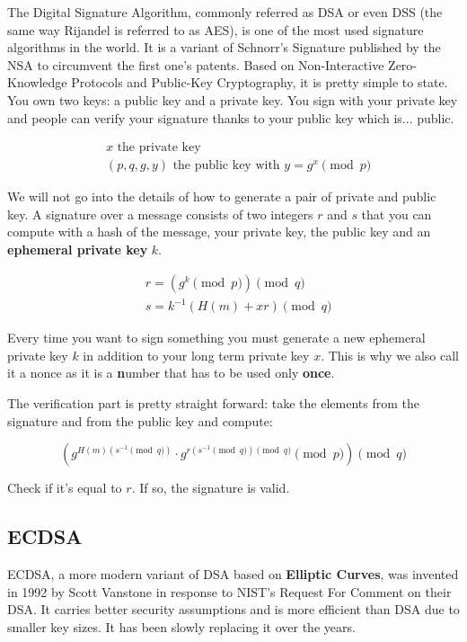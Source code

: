 \documentclass[a4paper,11pt]{article}
\begin{document}
The Digital Signature Algorithm, commonly referred as DSA or even DSS (the same way Rijandel is referred to as AES), is one of the most used signature algorithms in the world. It is a variant of Schnorr's Signature\cite{schnorr} published by the NSA to circumvent the first one's patents. Based on Non-Interactive Zero-Knowledge Protocols and Public-Key Cryptography, it is pretty simple to state. You own two keys: a public key and a private key. You sign with your private key and people can verify your signature thanks to your public key which is... public.

\begin{align*}
&x \text{ the private key} \\
&(p, q, g, y) \text{ the public key with } y = g^x \pmod{p}
\end{align*}

We will not go into the details of how to generate a pair of private and public key. A signature over a message consists of two integers $r$ and $s$ that you can compute with a hash of the message, your private key, the public key and an \textbf{ephemeral private key} $k$.

\begin{align*}
&r = (g^k \pmod{p}) \pmod{q}\\
&s = k^{-1} ( H(m) + x r ) \pmod{q}
\end{align*}

Every time you want to sign something you must generate a new ephemeral private key $k$ in addition to your long term private key $x$. This is why we also call it a nonce as it is a \textbf{n}umber that has to be used only \textbf{once}.

The verification part is pretty straight forward: take the elements from the signature and from the public key and compute:

$$ (g^{H(m) (s^{-1} \pmod{q})} \cdot g^{r (s^{-1} \pmod{q}) \pmod{q}} \pmod{p}) \pmod{q} $$

Check if it's equal to $r$. If so, the signature is valid.

\subsection{ECDSA}\label{ecdsa}

ECDSA, a more modern variant of DSA based on \textbf{Elliptic Curves}, was invented in 1992 by Scott Vanstone in response to NIST's Request For Comment on their DSA\cite{ecdsa}. It carries better security assumptions and is more efficient than DSA due to smaller key sizes. It has been slowly replacing it over the years.
\end{document}
